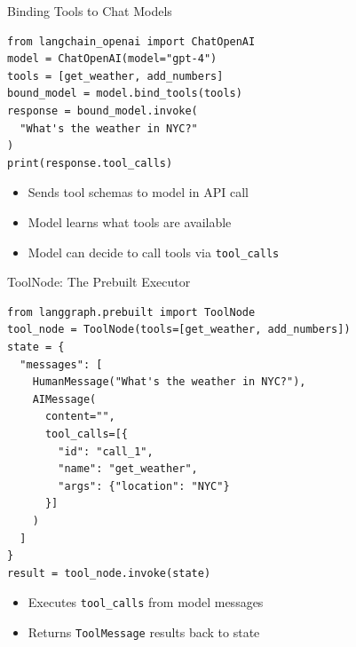\documentclass[aspectratio=169,11pt]{beamer}
\begin{document}
\begin{frame}[fragile]{Binding Tools to Chat Models}
  \begin{codebox}
    \begin{lstlisting}
from langchain_openai import ChatOpenAI
model = ChatOpenAI(model="gpt-4")
tools = [get_weather, add_numbers]
bound_model = model.bind_tools(tools)
response = bound_model.invoke(
  "What's the weather in NYC?"
)
print(response.tool_calls)
    \end{lstlisting}
  \end{codebox}
  \vspace{0.1cm}
  \begin{tipbox}
    \setlength{\itemsep}{1pt}
    \begin{itemize}
      \item Sends tool schemas to model in API call
      \item Model learns what tools are available
      \item Model can decide to call tools via \texttt{tool\_calls}
    \end{itemize}
  \end{tipbox}
\end{frame}

\begin{frame}[fragile,shrink=15]{ToolNode: The Prebuilt Executor}
  \begin{codebox}
    \begin{lstlisting}
from langgraph.prebuilt import ToolNode
tool_node = ToolNode(tools=[get_weather, add_numbers])
state = {
  "messages": [
    HumanMessage("What's the weather in NYC?"),
    AIMessage(
      content="",
      tool_calls=[{
        "id": "call_1",
        "name": "get_weather",
        "args": {"location": "NYC"}
      }]
    )
  ]
}
result = tool_node.invoke(state)
    \end{lstlisting}
  \end{codebox}
  \vspace{0.1cm}
  \begin{tipbox}
    \setlength{\itemsep}{1pt}
    \begin{itemize}
      \item Executes \texttt{tool\_calls} from model messages
      \item Returns \texttt{ToolMessage} results back to state
    \end{itemize}
  \end{tipbox}
\end{frame}
\end{document}

